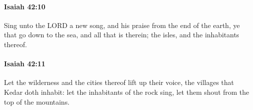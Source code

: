 		\paragraph{Isaiah 42:10} %
			\label{ISAIAH-42-10}

			Sing unto the LORD a new song, and his praise from the end of the earth, ye that go down to the sea, and all that is therein; the isles, and the inhabitants thereof.


		\paragraph{Isaiah 42:11} %
			\label{ISAIAH-42-11}

			Let the wilderness and the cities thereof lift up their voice, the villages that Kedar doth inhabit: let the inhabitants of the rock sing, let them shout from the top of the mountains.


